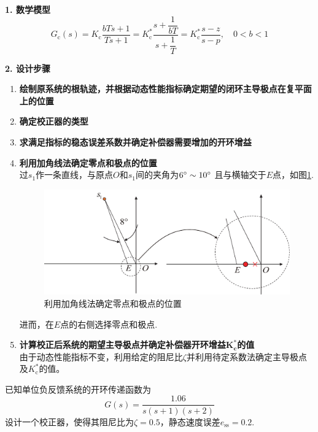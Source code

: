 \noindent \textbf{1. 数学模型}
\begin{equation}
	G_{\text{c}}(s) = K_\text{c} \dfrac{bTs+1}{Ts + 1} = K_\text{c}^* \dfrac{s + \dfrac{1}{bT}}{s + \dfrac{1}{T}} = K_\text{c}^* \dfrac{s - z}{s - p}, \quad 0<b<1
\end{equation}

\noindent \textbf{2. 设计步骤}
\begin{enumerate}
	\item \textbf{绘制原系统的根轨迹，并根据动态性能指标确定期望的闭环主导极点在复平面上的位置}
	\item \textbf{确定校正器的类型}
	\item \textbf{求满足指标的稳态误差系数并确定补偿器需要增加的开环增益}
	\item \textbf{利用加角线法确定零点和极点的位置}\\
	过$s_1$作一条直线，与原点$O$和$s_1$间的夹角为$6{}^{\circ} \sim 10{}^{\circ}$ 且与横轴交于$E$点，如图\ref{根轨迹滞后}.
	\begin{figure}[!htb]
		\centering
		\includegraphics[width=0.7\linewidth]{pic/根轨迹滞后.pdf}
		\vspace*{-1em}
		\caption{利用加角线法确定零点和极点的位置}
		\label{根轨迹滞后}
	\end{figure}

	进而，在$E$点的右侧选择零点和极点.
	\item \textbf{计算校正后系统的期望主导极点并确定补偿器开环增益$\bm{K_\text{c}^*}$的值}\\
	由于动态性能指标不变，利用给定的阻尼比$\zeta$并利用待定系数法确定主导极点及$K_\text{c}^*$的值。
\end{enumerate}

\examples \label{6.5} 已知单位负反馈系统的开环传递函数为
\[
G(s) = \dfrac{1.06}{s(s+1)(s+2)}
\]
设计一个校正器，使得其阻尼比为$\zeta = 0.5$，静态速度误差$e_{\text{ss}} = 0.2.$


